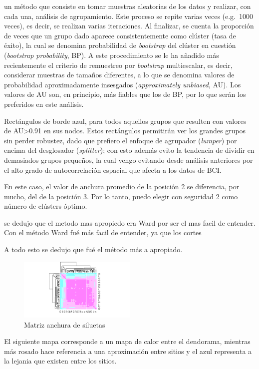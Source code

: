 \documentclass[11pt,]{article}
\begin{document}
un método que consiste en tomar muestras aleatorias de los datos y
realizar, con cada una, análisis de agrupamiento. Este proceso se repite
varias veces (e.g.~1000 veces), es decir, se realizan varias
iteraciones. Al finalizar, se cuenta la proporción de veces que un grupo
dado aparece consistentemente como clúster (tasa de éxito), la cual se
denomina probabilidad de \emph{bootstrap} del clúster en cuestión
(\emph{bootstrap probability}, BP). A este procedimiento se le ha
añadido más recientemente el criterio de remuestreo por \emph{bootstrap}
multiescalar, es decir, considerar muestras de tamaños diferentes, a lo
que se denomina valores de probabilidad aproximadamente insesgados
(\emph{approximately unbiased}, AU). Los valores de AU son, en
principio, más fiables que los de BP, por lo que serán los preferidos en
este análisis.

Rectángulos de borde azul, para todos aquellos grupos que resulten con
valores de AU\textgreater{}0.91 en sus nodos. Estos rectángulos
permitirán ver los grandes grupos sin perder robustez, dado que prefiero
el enfoque de agrupador (\emph{lumper}) por encima del desglosador
(\emph{splitter}); con esto además evito la tendencia de dividir en
demasiados grupos pequeños, la cual vengo evitando desde análisis
anteriores por el alto grado de autocorrelación espacial que afecta a
los datos de BCI.

En este caso, el valor de anchura promedio de la posición 2 se
diferencia, por mucho, del de la posición 3. Por lo tanto, puedo elegir
con seguridad 2 como número de clústers óptimo.

se dedujo que el metodo mas apropiedo era Ward por ser el mas facil de
entender. Con el método Ward fué más facil de entender, ya que los
cortes

A todo esto se dedujo que fué el método más a apropiado.

\begin{figure}
\centering
\includegraphics[width=0.50000\textwidth]{anchura_siluetas_matriz.png}
\caption{Matriz anchura de siluetas}
\end{figure}

El siguiente mapa corresponde a un mapa de calor entre el dendorama,
mientras más rosado hace referencia a una aproximación entre sitios y el
azul representa a la lejania que existen entre los sitios.
\end{document}
